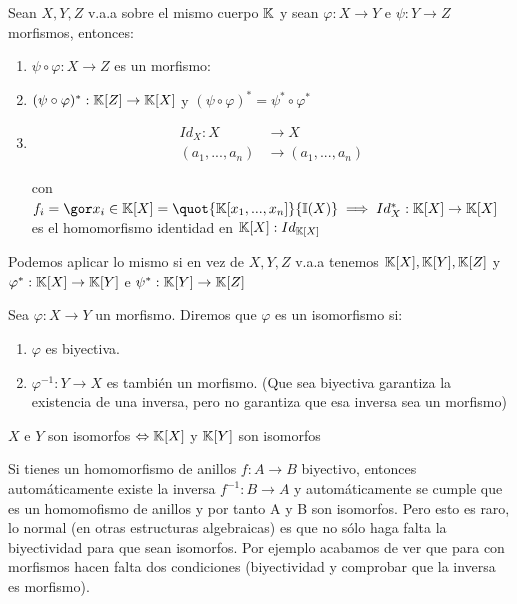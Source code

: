 \begin{lemma}
	Sean $X,Y,Z$ v.a.a sobre el mismo cuerpo $\mathbb{K}$ y sean $\varphi:X \rightarrow Y$ e $\psi: Y \rightarrow Z$ morfismos, entonces:
	\begin{enumerate}
		\item $\psi \circ \varphi: X \rightarrow Z$ es un morfismo:
		\item $(\psi \circ \varphi)^*: \mathbb{K}[Z] \rightarrow \mathbb{K}[X]$ y $(\psi \circ \varphi)^*=\psi^* \circ \varphi^*$
		\item

		\begin{align*}
		Id_X: X & \rightarrow X \\
		(a_1,...,a_n) & \rightarrow (a_1,...,a_n)
		\end{align*}

		con $f_i=\cls{x_i}\in  \K[X]=\quot{\K[x_1,...,x_n]}{\I(X)} \implies Id_X^*: \K[X] \rightarrow \K[X]$ es el homomorfismo identidad en $\mathbb{K}[X]:Id_{\mathbb{K}[X]}$
	\end{enumerate}
\end{lemma}

\nota Podemos aplicar lo mismo si en vez de $X,Y,Z$ v.a.a tenemos $\mathbb{K}[X], \mathbb{K}[Y], \mathbb{K}[Z]$ y $\varphi^*:\mathbb{K}[X] \rightarrow \mathbb{K}[Y]$ e $\psi^*: \mathbb{K}[Y] \rightarrow \mathbb{K}[Z]$

\begin{defn}
	Sea $\varphi: X \rightarrow Y$ un morfismo. Diremos que $\varphi$ es un isomorfismo si:
	\begin{enumerate}
		\item $\varphi$ es biyectiva.
		\item $\varphi^{-1}:Y \rightarrow X$ es también un morfismo. (Que sea biyectiva garantiza la existencia de una inversa, pero no garantiza que esa inversa sea un morfismo)
	\end{enumerate}
\end{defn}

\begin{corol}\label{cor:isomorfos}
	$X$ e $Y$ son isomorfos $\Leftrightarrow \mathbb{K}[X]$ y $\mathbb{K}[Y]$ son isomorfos
\end{corol}

\nota Si tienes un homomorfismo de anillos $f:A \rightarrow B$ biyectivo, entonces automáticamente existe la inversa $f^{-1}: B \rightarrow A$ y automáticamente se cumple que es un homomofismo de anillos y por tanto A y B son isomorfos. Pero esto es raro, lo normal (en otras estructuras algebraicas) es que no sólo haga falta la biyectividad para que sean isomorfos. Por ejemplo acabamos de ver que para con morfismos hacen falta dos condiciones (biyectividad y comprobar que la inversa es morfismo).

